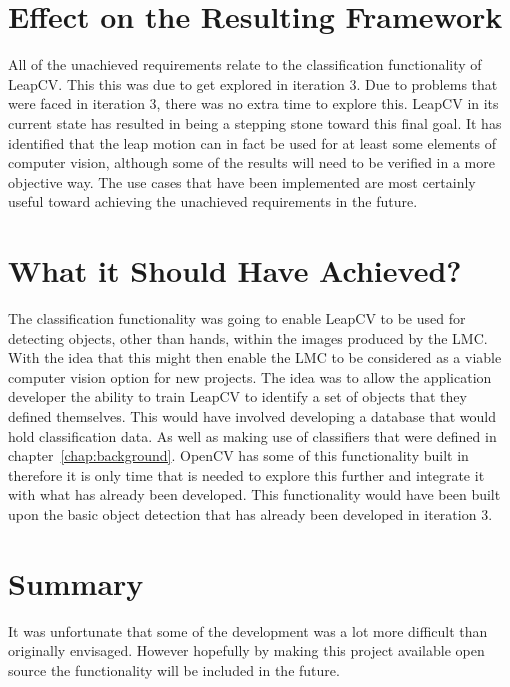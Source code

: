 \documentclass[11pt,oneside]{report}
\begin{document}
		\section{Effect on the Resulting Framework}
			All of the unachieved requirements relate to the classification functionality of LeapCV.
			This this was due to get explored in iteration 3.
			Due to problems that were faced in iteration 3, there was no extra time to explore this.
			LeapCV in its current state has resulted in being a stepping stone toward this final goal.
			It has identified that the leap motion can in fact be used for at least some elements of computer vision, although some of the results will need to be verified in a more objective way.
			The use cases that have been implemented are most certainly useful toward achieving the unachieved requirements in the future.
			
		\section{What it Should Have Achieved?}
			The classification functionality was going to enable LeapCV to be used for detecting objects, other than hands, within the images produced by the LMC.
			With the idea that this might then enable the LMC to be considered as a viable computer vision option for new projects.
			The idea was to allow the application developer the ability to train LeapCV to identify a set of objects that they defined themselves. This would have involved developing a database that would hold classification data.
			As well as making use of classifiers that were defined in chapter~\ref{chap:background}.
			OpenCV has some of this functionality built in therefore it is only time that is needed to explore this further and integrate it with what has already been developed.
			This functionality would have been built upon the basic object detection that has already been developed in iteration 3.
		
		\section{Summary}
			It was unfortunate that some of the development was a lot more difficult than originally envisaged.
			However hopefully by making this project available open source the functionality will be included in the future.
		

	
\end{document}
